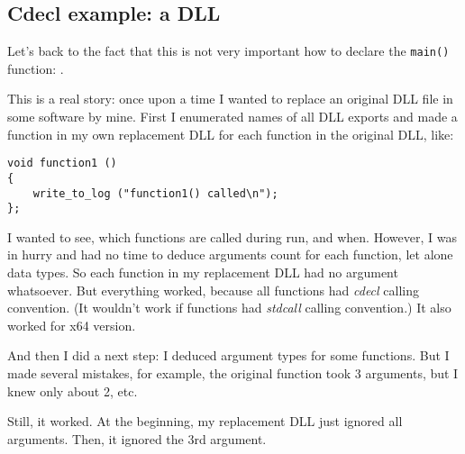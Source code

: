 \subsection{Cdecl example: a DLL}
\label{cdecl_DLL}

Let's back to the fact that this is not very important how to declare the \verb|main()| function: .

This is a real story: once upon a time I wanted to replace an original DLL file in some software by mine.
First I enumerated names of all DLL exports and made a function in my own replacement DLL for each function in the original DLL, like:

\begin{lstlisting}[style=customc]
void function1 ()
{
	write_to_log ("function1() called\n");
};
\end{lstlisting}

I wanted to see, which functions are called during run, and when.
However, I was in hurry and had no time to deduce arguments count for each function, let alone data types.
So each function in my replacement DLL had no argument whatsoever.
But everything worked, because all functions had \emph{cdecl} calling convention.
(It wouldn't work if functions had \emph{stdcall} calling convention.)
It also worked for x64 version.

And then I did a next step: I deduced argument types for some functions.
But I made several mistakes, for example, the original function took 3 arguments, but I knew only about 2, etc.

Still, it worked.
At the beginning, my replacement DLL just ignored all arguments.
Then, it ignored the 3rd argument.

